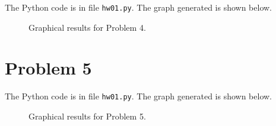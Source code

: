 \documentclass[letter, 12pt]{article}
\begin{document}
The Python code is in file \texttt{hw01.py}. The graph generated is shown below.
\begin{figure}[H]
  	\caption{Graphical results for Problem 4.}
  	\label{fig:hw01_prob4}
\end{figure}



\section*{Problem 5}

The Python code is in file \texttt{hw01.py}. The graph generated is shown below.
\begin{figure}[H]
  	\caption{Graphical results for Problem 5.}
  	\label{fig:hw01_prob5}
\end{figure}
\end{document}
